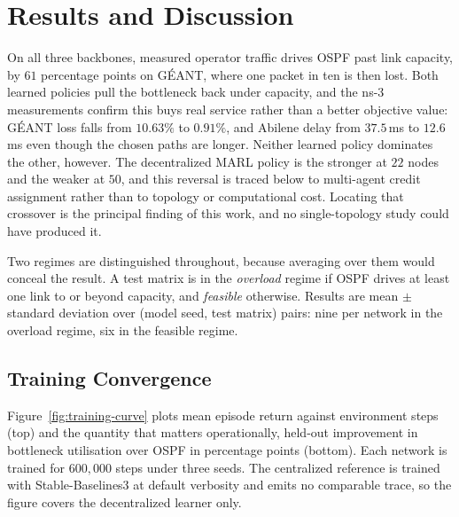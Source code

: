 \section{Results and Discussion}
\label{sec:results}

On all three backbones, measured operator traffic drives OSPF past link
capacity, by $61$ percentage points on GÉANT, where one packet in ten is then
lost. Both learned policies pull the bottleneck back under capacity, and the
ns-3 measurements confirm this buys real service rather than a better objective
value: GÉANT loss falls from $10.63\%$ to $0.91\%$, and Abilene delay from
$37.5$\,ms to $12.6$\,ms even though the chosen paths are longer. Neither
learned policy dominates the other, however. The decentralized MARL policy is
the stronger at $22$ nodes and the weaker at $50$, and this reversal is traced
below to multi-agent credit assignment rather than to topology or computational
cost. Locating that crossover is the principal finding of this work, and no
single-topology study could have produced it.

Two regimes are distinguished throughout, because averaging over them would
conceal the result. A test matrix is in the \emph{overload} regime if OSPF
drives at least one link to or beyond capacity, and \emph{feasible} otherwise.
Results are mean $\pm$ standard deviation over (model seed, test matrix) pairs:
nine per network in the overload regime, six in the feasible regime.

\subsection{Training Convergence}
\label{sec:res-training}

Figure~\ref{fig:training-curve} plots mean episode return against environment
steps (top) and the quantity that matters operationally, held-out improvement in
bottleneck utilisation over OSPF in percentage points (bottom). Each network is
trained for $600{,}000$ steps under three seeds. The centralized reference is
trained with Stable-Baselines3 at default verbosity and emits no comparable
trace, so the figure covers the decentralized learner only.

